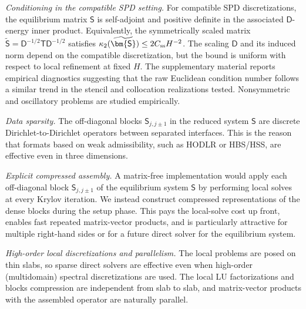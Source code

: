 \documentclass[final,onefignum,onetabnum]{siamart250211}
\newcommand{\mtx}[1]{\bm{\mathsf{#1}}}
\theoremstyle{definition}
\begin{document}
\textit{Conditioning in the compatible SPD setting.}
For compatible SPD discretizations, the equilibrium matrix $\mtx{S}$ is self-adjoint and positive definite in the associated $\mtx{D}$-energy inner product. Equivalently, the symmetrically scaled matrix $\widetilde{\mtx{S}}=\mtx{D}^{-1/2}\mtx{T}\mtx{D}^{-1/2}$ satisfies $\kappa_2(\widetilde{\mtx{S}})\le 2C_{\rm ss}H^{-2}$. The scaling $\mtx{D}$ and its induced norm depend on the compatible discretization, but the bound is uniform with respect to local refinement at fixed $H$. The supplementary material reports empirical diagnostics suggesting that the raw Euclidean condition number follows a similar trend in the stencil and collocation realizations tested. Nonsymmetric and oscillatory problems are studied empirically.

\textit{Data sparsity.}
The off-diagonal blocks $\mtx{S}_{j,j \pm 1}$ in the reduced system $\mtx{S}$ are discrete Dirichlet-to-Dirichlet operators between separated interfaces.  This is the reason that formats based on weak admissibility, such as HODLR or HBS/HSS, are effective even in three dimensions.

\textit{Explicit compressed assembly.}
A matrix-free implementation would apply each off-diagonal block $\mtx{S}_{j,j \pm 1}$ of the equilibrium system $\mtx{S}$ by performing local solves at every Krylov iteration. We instead construct compressed representations of the dense blocks during the setup phase. This pays the local-solve cost up front, enables fast repeated matrix-vector products, and is particularly attractive for multiple right-hand sides or for a future direct solver for the equilibrium system.

\textit{High-order local discretizations and parallelism.}
The local problems are posed on thin slabs, so sparse direct solvers are effective even when high-order (multidomain) spectral discretizations are used. The local LU factorizations and blocks compression are independent from slab to slab, and matrix-vector products with the assembled operator are naturally parallel.
\end{document}
